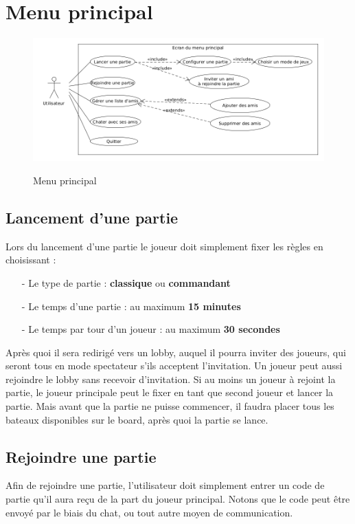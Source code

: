 \documentclass[../besoin_user.tex]{subfiles}
\begin{document}
\section{Menu principal}
\begin{figure}[h]
    \centering
    \includegraphics[scale=0.5]{img_fonctionnel/use_case_user_ecran_principal.png}
    \label{fig:user_menu_principal}
    \caption{Menu principal}
\end{figure}

\subsection{Lancement d'une partie}
Lors du lancement d'une partie le joueur doit simplement fixer les règles en choisissant :
\begin{itemize}
	\item[-] Le type de partie : \textbf{classique} ou \textbf{commandant}
	\item[-] Le temps d'une partie : au maximum \textbf{15 minutes}
	\item[-] Le temps par tour d'un joueur : au maximum \textbf{30 secondes}
\end{itemize}

Après quoi il sera redirigé vers un lobby, auquel il pourra inviter des joueurs, qui seront tous en mode spectateur s'ils acceptent l'invitation.
Un joueur peut aussi rejoindre le lobby sans recevoir d'invitation.
Si au moins un joueur à rejoint la partie, le joueur principale peut le fixer en tant que second joueur et lancer la partie.
Mais avant que la partie ne puisse commencer, il faudra placer tous les bateaux disponibles sur le board, après quoi la partie se lance.

\subsection{Rejoindre une partie}
Afin de rejoindre une partie, l'utilisateur doit simplement entrer un code de partie qu'il aura reçu de la part du joueur principal.
Notons que le code peut être envoyé par le biais du chat, ou tout autre moyen de communication.
\end{document}
